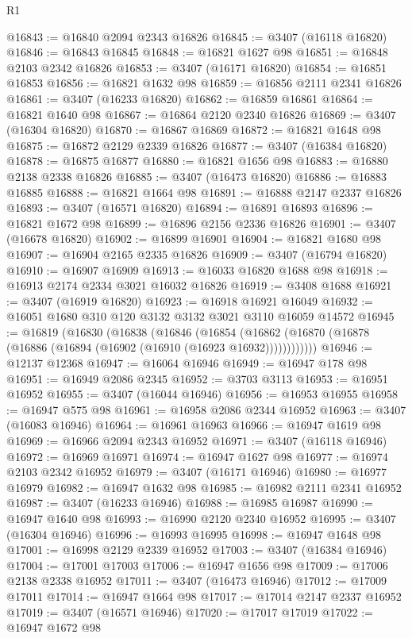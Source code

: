 \begin{lexlean}{R1}
\begin{coremodule}
@16843 := @16840 @2094 @2343 @16826
@16845 := @3407 (@16118 @16820)
@16846 := @16843 @16845
@16848 := @16821 @1627 @98
@16851 := @16848 @2103 @2342 @16826
@16853 := @3407 (@16171 @16820)
@16854 := @16851 @16853
@16856 := @16821 @1632 @98
@16859 := @16856 @2111 @2341 @16826
@16861 := @3407 (@16233 @16820)
@16862 := @16859 @16861
@16864 := @16821 @1640 @98
@16867 := @16864 @2120 @2340 @16826
@16869 := @3407 (@16304 @16820)
@16870 := @16867 @16869
@16872 := @16821 @1648 @98
@16875 := @16872 @2129 @2339 @16826
@16877 := @3407 (@16384 @16820)
@16878 := @16875 @16877
@16880 := @16821 @1656 @98
@16883 := @16880 @2138 @2338 @16826
@16885 := @3407 (@16473 @16820)
@16886 := @16883 @16885
@16888 := @16821 @1664 @98
@16891 := @16888 @2147 @2337 @16826
@16893 := @3407 (@16571 @16820)
@16894 := @16891 @16893
@16896 := @16821 @1672 @98
@16899 := @16896 @2156 @2336 @16826
@16901 := @3407 (@16678 @16820)
@16902 := @16899 @16901
@16904 := @16821 @1680 @98
@16907 := @16904 @2165 @2335 @16826
@16909 := @3407 (@16794 @16820)
@16910 := @16907 @16909
@16913 := @16033 @16820 @1688 @98
@16918 := @16913 @2174 @2334 @3021 @16032 @16826
@16919 := @3408 @1688
@16921 := @3407 (@16919 @16820)
@16923 := @16918 @16921 @16049
@16932 := @16051 @1680 @310 @120 @3132 @3132 @3021 @3110 @16059 @14572
@16945 := @16819
    (@16830
      (@16838
        (@16846
          (@16854 (@16862 (@16870 (@16878 (@16886 (@16894 (@16902 (@16910 (@16923 @16932))))))))))))
@16946 := @12137 @12368
@16947 := @16064 @16946
@16949 := @16947 @178 @98
@16951 := @16949 @2086 @2345
@16952 := @3703 @3113
@16953 := @16951 @16952
@16955 := @3407 (@16044 @16946)
@16956 := @16953 @16955
@16958 := @16947 @575 @98
@16961 := @16958 @2086 @2344 @16952
@16963 := @3407 (@16083 @16946)
@16964 := @16961 @16963
@16966 := @16947 @1619 @98
@16969 := @16966 @2094 @2343 @16952
@16971 := @3407 (@16118 @16946)
@16972 := @16969 @16971
@16974 := @16947 @1627 @98
@16977 := @16974 @2103 @2342 @16952
@16979 := @3407 (@16171 @16946)
@16980 := @16977 @16979
@16982 := @16947 @1632 @98
@16985 := @16982 @2111 @2341 @16952
@16987 := @3407 (@16233 @16946)
@16988 := @16985 @16987
@16990 := @16947 @1640 @98
@16993 := @16990 @2120 @2340 @16952
@16995 := @3407 (@16304 @16946)
@16996 := @16993 @16995
@16998 := @16947 @1648 @98
@17001 := @16998 @2129 @2339 @16952
@17003 := @3407 (@16384 @16946)
@17004 := @17001 @17003
@17006 := @16947 @1656 @98
@17009 := @17006 @2138 @2338 @16952
@17011 := @3407 (@16473 @16946)
@17012 := @17009 @17011
@17014 := @16947 @1664 @98
@17017 := @17014 @2147 @2337 @16952
@17019 := @3407 (@16571 @16946)
@17020 := @17017 @17019
@17022 := @16947 @1672 @98

\end{coremodule}
\end{lexlean}
